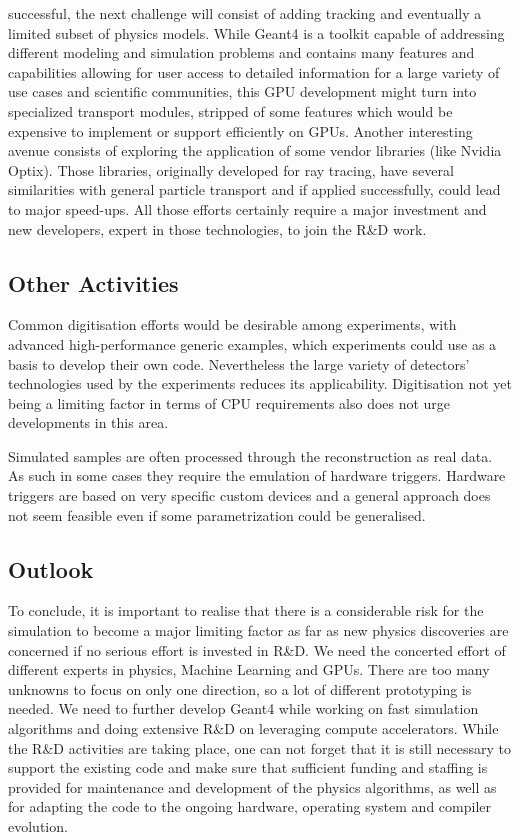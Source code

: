 \documentclass[10pt,a4paper]{article}
\begin{document}
successful, the next challenge will consist of adding tracking and
eventually a limited subset of physics models. While Geant4 is a toolkit
capable of addressing different modeling and simulation problems and
contains many features and capabilities allowing for user access to
detailed information for a large variety of use cases and scientific
communities, this GPU development might turn into specialized transport
modules, stripped of some features which would be expensive to implement
or support efficiently on GPUs. Another interesting avenue consists of
exploring the application of some vendor libraries (like Nvidia Optix).
Those libraries, originally developed for ray tracing, have several
similarities with general particle transport and if applied
successfully, could lead to major speed-ups. All those efforts certainly
require a major investment and new developers, expert in those
technologies, to join the R\&D work.

\hypertarget{other-activities}{%
\subsection{Other Activities}\label{other-activities}}

Common digitisation efforts would be desirable among experiments, with
advanced high-performance generic examples, which experiments could use
as a basis to develop their own code. Nevertheless the large variety of
detectors' technologies used by the experiments reduces its
applicability. Digitisation not yet being a limiting factor in terms of
CPU requirements also does not urge developments in this area.

Simulated samples are often processed through the reconstruction as real
data. As such in some cases they require the emulation of hardware
triggers. Hardware triggers are based on very specific custom devices
and a general approach does not seem feasible even if some
parametrization could be generalised.

\hypertarget{outlook}{%
\subsection{Outlook}\label{outlook}}

To conclude, it is important to realise that there is a considerable
risk for the simulation to become a major limiting factor as far as new
physics discoveries are concerned if no serious effort is invested in
R\&D. We need the concerted effort of different experts in physics,
Machine Learning and GPUs. There are too many unknowns to focus on only
one direction, so a lot of different prototyping is needed. We need to
further develop Geant4 while working on fast simulation algorithms and
doing extensive R\&D on leveraging compute accelerators. While the R\&D
activities are taking place, one can not forget that it is still
necessary to support the existing code and make sure that sufficient
funding and staffing is provided for maintenance and development of the
physics algorithms, as well as for adapting the code to the ongoing
hardware, operating system and compiler evolution.
\end{document}
